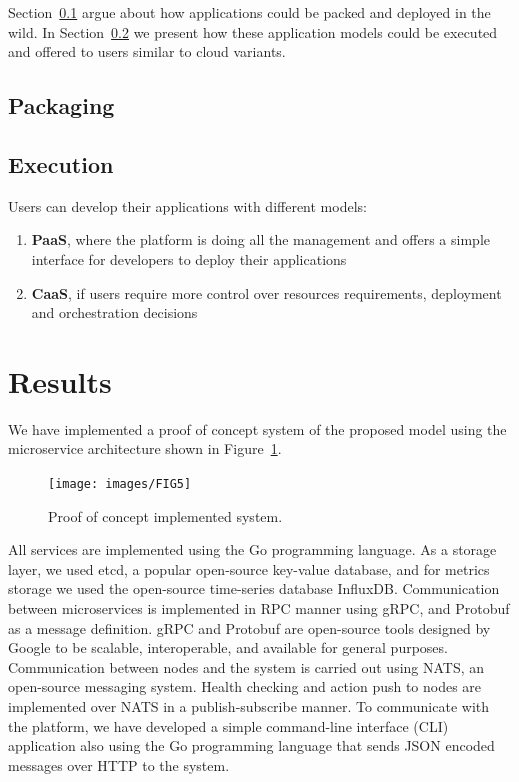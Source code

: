 Section~\ref{sec:packaging} argue about how applications could be packed and deployed in the wild. In Section~\ref{sec:execution} we present how these application models could be executed and offered to users similar to cloud variants.
%
\subsection{Packaging}\label{sec:packaging}
%
%
\subsection{Execution}\label{sec:execution}
%
Users can develop their applications with different models: 
\begin{enumerate}[start=1,label={(\bfseries \arabic*)}]
	\item \textbf{PaaS}, where the platform is doing all the management and offers a simple interface for developers to deploy their applications 
	\item  \textbf{CaaS}, if users require more control over resources requirements, deployment and orchestration decisions
\end{enumerate}
%
%
\section{Results}\label{sec:results}
%
We have implemented a proof of concept system of the proposed model using the microservice architecture shown in Figure~\ref{fig:fig11}.
\begin{figure}[!htbp]
	\begin{center}
		\texttt{[image: images/FIG5]}
	\end{center}
	\vspace{-0.9cm}
	\caption{Proof of concept implemented system.}
	\label{fig:fig11}
\end{figure} 

All services are implemented using the Go programming language. As a storage layer, we used etcd, a popular open-source key-value database, and for metrics storage we used the open-source time-series database InfluxDB. Communication between microservices is implemented in RPC manner using gRPC, and Protobuf as a message definition. gRPC and Protobuf are open-source tools designed by Google to be scalable, interoperable, and available for general purposes. Communication between nodes and the system is carried out using NATS, an open-source messaging system. Health checking and action push to nodes are implemented over NATS in a publish-subscribe manner. To communicate with the platform, we have developed a simple command-line interface (CLI) application also using the Go programming language that sends JSON encoded messages over HTTP to the system.

